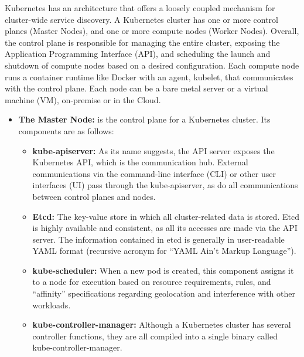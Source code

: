 Kubernetes has an architecture that offers a loosely coupled mechanism for cluster-wide service discovery.
A Kubernetes cluster has one or more control planes (Master Nodes), and one or more compute nodes (Worker Nodes).
Overall, the control plane is responsible for managing the entire cluster, exposing the Application Programming Interface (API), and scheduling the launch and shutdown of compute nodes based on a desired configuration.
Each compute node runs a container runtime like Docker with an agent, kubelet, that communicates with the control plane.
Each node can be a bare metal server or a virtual machine (VM), on-premise or in the Cloud.

\begin{itemize}
    \item \textbf{The Master Node:} is the control plane for a Kubernetes cluster. Its components are as follows:
    \begin{itemize}
        \item[-] \textbf{kube-apiserver:} As its name suggests, the API server exposes the Kubernetes API, which is the communication hub. External communications via the command-line interface (CLI) or other user interfaces (UI) pass through the kube-apiserver, as do all communications between control planes and nodes.
        \item[-] \textbf{Etcd:} The key-value store in which all cluster-related data is stored. Etcd is highly available and consistent, as all its accesses are made via the API server. The information contained in etcd is generally in user-readable YAML format (recursive acronym for ``YAML Ain't Markup Language'').
        \item[-] \textbf{kube-scheduler:} When a new pod is created, this component assigns it to a node for execution based on resource requirements, rules, and ``affinity'' specifications regarding geolocation and interference with other workloads.
        \item[-] \textbf{kube-controller-manager:} Although a Kubernetes cluster has several controller functions, they are all compiled into a single binary called kube-controller-manager.
    \end{itemize}


\end{itemize}
